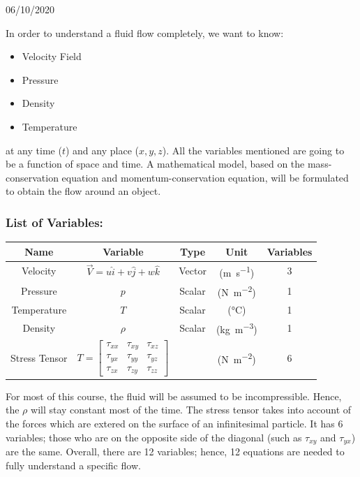 \documentclass[class=report, crop=false, 12pt,a4paper]{standalone}
\begin{document}
\begin{center}
    06/10/2020
\end{center}
In order to understand a fluid flow completely, we want to know:
\begin{itemize}[noitemsep]
    \item Velocity Field
    \item Pressure
    \item Density
    \item Temperature
\end{itemize}
at any time ($t$) and any place ($x,y,z$). All the variables mentioned are going to be a function of space and time. A mathematical model, based on the mass-conservation equation and momentum-conservation equation, will be formulated to obtain the flow around an object.
\subsubsection{List of Variables:}
\begin{center}
    \begin{tabular}{ |c|c|c|c|c| } 
     \hline
     Name & Variable & Type & Unit & Variables \\ 
     \hline
     Velocity & $\vec{V} = u\hat{i}+v\hat{j}+w\hat{k}$ & Vector & (\si{\meter\per\second}) & 3 \\
     \hline
     Pressure & $p$ & Scalar & (\si{\newton\per\meter\squared}) & 1 \\
     \hline
     Temperature & $T$ & Scalar & (\si{\celsius}) & 1 \\
     \hline
     Density & $\rho$ & Scalar & (\si{\kilogram\per\meter\cubed}) & 1 \\
     \hline
     Stress Tensor & $T = \left[ \begin{array}{ccc} \tau_{xx} & \tau_{xy} & \tau_{xz} \\ \tau_{yx} & \tau_{yy} & \tau_{yz} \\ \tau_{zx} & \tau_{zy} & \tau_{zz} \end{array}\right]$ & & (\si{\newton\per\meter\squared}) & 6 \\
     \hline
    \end{tabular}
\end{center}
For most of this course, the fluid will be assumed to be incompressible. Hence, the $\rho$ will stay constant most of the time. The stress tensor takes into account of the forces which are extered on the surface of an infinitesimal particle. It has 6 variables; those who are on the opposite side of the diagonal (such as $\tau_{xy}$ and $\tau_{yx}$) are the same. Overall, there are 12 variables; hence, 12 equations are needed to fully understand a specific flow.
\end{document}
